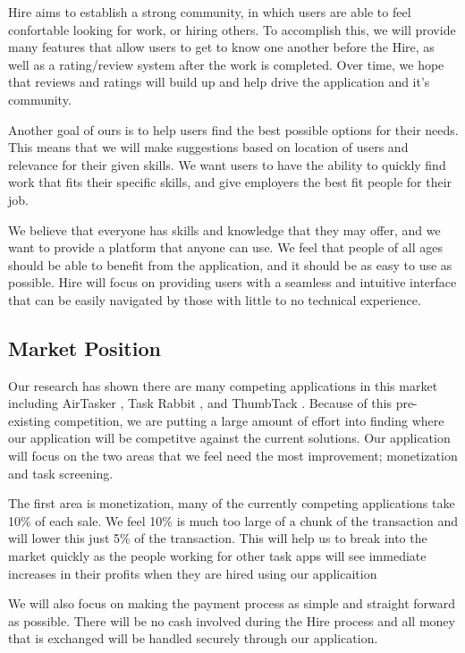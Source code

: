 \documentclass[11pt]{article}
\begin{document}
Hire aims to establish a strong community, in which users are able to feel confortable looking for work, or hiring others. To accomplish this, we will provide many features that allow users to get to know one another before the Hire, as well as a rating/review system after the work is completed. Over time, we hope that reviews and ratings will build up and help drive the application and it's community.

Another goal of ours is to help users find the best possible options for their needs. This means that we will make suggestions based on location of users and relevance for their given skills. We want users to have the ability to quickly find work that fits their specific skills, and give employers the best fit people for their job.

We believe that everyone has skills and knowledge that they may offer, and we want to provide a platform that anyone can use. We feel that people of all ages should be able to benefit from the application, and it should be as easy to use as possible. Hire will focus on providing users with a seamless and intuitive interface that can be easily navigated by those with little to no technical experience.

\subsection{Market Position}

Our research has shown there are many competing applications in this market including AirTasker \cite{AirTasker}, Task Rabbit \cite{TaskRabbit}, and ThumbTack \cite{ThumbTack}. 
Because of this pre-existing competition, we are putting a large amount of effort into finding where our application will be competitve against the current solutions. 
Our application will focus on the two areas that we feel need the most improvement; monetization and task screening.

The first area is monetization, many of the currently competing applications take 10\% of each sale. 
We feel 10\% is much too large of a chunk of the transaction and will lower this just 5\% of the transaction. 
This will help us to break into the market quickly as the people working for other task apps will see immediate increases in their profits when they are hired using our applicaition

We will also focus on making the payment process as simple and straight forward as possible. 
There will be no cash involved during the Hire process and all money that is exchanged will be handled securely through our application.
\end{document}
